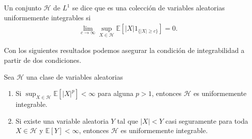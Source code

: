 \begin{definition}
Un conjunto $\mathcal{H}$ de $L^1$ se dice que es una colección de variables aleatorias uniformemente integrables si
	\begin{align*}
	\lim_{c \rightarrow \infty} \sup_{X \in \mathcal{H}} \mathbb{E}[|X| 1_{ \{|X| \geq c\} }] = 0.
	\end{align*}
\end{definition}

Con los siguientes resultados podemos asegurar la condición de integrabilidad a partir de dos condiciones.

\begin{proposition}
\label{cond_uniforminte}
Sea $\mathcal{H}$ una clase de variables aleatorias
	\begin{enumerate}
	\item Si $\sup_{X \in \mathcal{H}} \mathbb{E}[|X|^p] < \infty$ para alguna $p > 1$, entonces $\mathcal{H}$ es uniformemente integrable.
	\item Si existe una variable aleatoria $Y$ tal que $|X| < Y$ casi seguramente para toda $X \in \mathcal{H}$ y $\mathbb{E}[Y] < \infty$, entonces $\mathcal{H}$ es uniformemente integrable.
	\end{enumerate}
\end{proposition}

